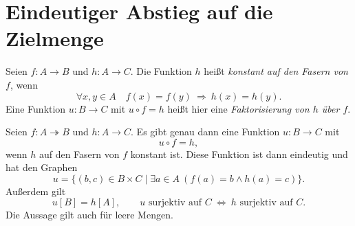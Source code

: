 \section{Eindeutiger Abstieg auf die Zielmenge}

\begin{definition}
Seien $f\colon A\to B$ und $h\colon A\to C$.
Die Funktion $h$ heißt \emph{konstant auf den Fasern von $f$}, wenn
\[
 \forall x,y\in A\quad
 f(x)=f(y)\ \Longrightarrow\ h(x)=h(y).
\]
Eine Funktion $u\colon B\to C$ mit $u\circ f=h$ heißt hier
eine \emph{Faktorisierung von $h$ über $f$}.
\end{definition}

\begin{theorem}
\label{b07guide:thm:factorization}
Seien $f\colon A\twoheadrightarrow B$ und $h\colon A\to C$.
Es gibt genau dann eine Funktion $u\colon B\to C$ mit
\[
 u\circ f=h,
\]
wenn $h$ auf den Fasern von $f$ konstant ist.
Diese Funktion ist dann eindeutig und hat den Graphen
\[
 u=\{(b,c)\in B\times C\mid
           \exists a\in A\ (f(a)=b\land h(a)=c)\}.
\]
Außerdem gilt
\[
 u[B]=h[A],\qquad
 u\text{ surjektiv auf }C
 \ \Longleftrightarrow\
 h\text{ surjektiv auf }C.
\]
Die Aussage gilt auch für leere Mengen.
\end{theorem}

